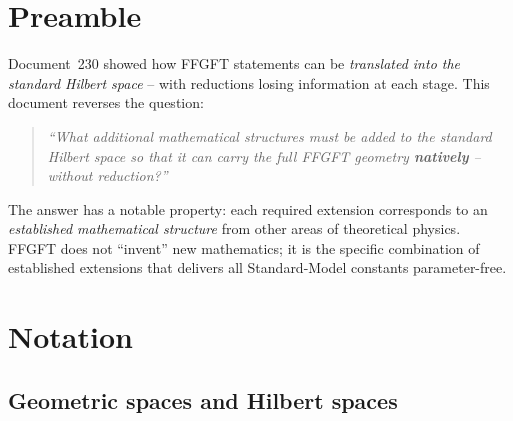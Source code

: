 
\section*{Preamble}

Document~230 showed how FFGFT statements can be \emph{translated into
the standard Hilbert space} -- with reductions losing information at
each stage. This document reverses the question:

\begin{quote}
\itshape
\enquote{What additional mathematical structures must be added to
the standard Hilbert space so that it can carry the full FFGFT
geometry \textbf{natively} -- without reduction?}
\end{quote}

The answer has a notable property: each required extension
corresponds to an \emph{established mathematical structure} from
other areas of theoretical physics. FFGFT does not \enquote{invent}
new mathematics; it is the specific combination of established
extensions that delivers all Standard-Model constants
parameter-free.

\section*{Notation}

\subsection*{Geometric spaces and Hilbert spaces}

